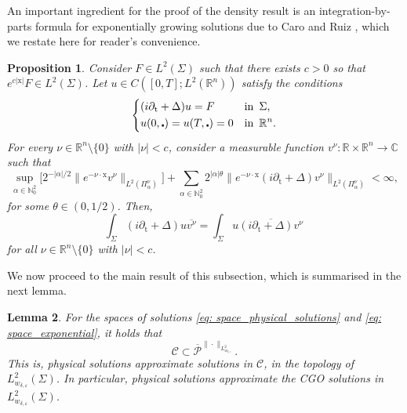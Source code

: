 \documentclass[10pt,a4paper]{amsart}
\newtheorem{proposition}{Proposition}[section]
\newtheorem{lemma}[proposition]{Lemma}
\theoremstyle{remark}
\theoremstyle{definition}
\newcommand{\R}{\mathbb{R}}
\newcommand{\C}{\mathbb{C}}
\newcommand{\N}{\mathbb{N}}
\newcommand{\tm}{\mathrm{t}}
\newcommand{\x}{\mathrm{x}}
\def\ve{\varepsilon}
\def\cal{\mathcal}
\def\ovl{\overline}
\begin{document}
An important ingredient for the proof of the density result is an integration-by-parts formula for exponentially growing solutions due to Caro and Ruiz \cite{zbMATH07801151}, which we restate here for reader's convenience. 
%
\begin{proposition}\cite[Proposition 4.9]{zbMATH07801151}\label{prop:CGO-PhS_int-by-parts}\sl 
Consider $F \in L^2(\Sigma)$ such that 
there exists $c > 0$ so that $e^{c|\x|} F \in L^2(\Sigma)$.
Let $u \in C([0,T]; L^2(\R^n))$ satisfy the conditions
%
\[
\left\{
%
		\begin{aligned}
		& (i\partial_\tm + \Delta) u = F & & \textnormal{in} \enspace \Sigma, \\
		& u(0, \centerdot) = u(T, \centerdot) = 0 &  & \textnormal{in} \enspace \R^n.
		\end{aligned}
%
	\right.
\]
%
For every $\nu \in \R^n \setminus \{ 0 \}$ with $|\nu| < c$,
consider a measurable function 
$v^\nu : \R \times \R^n \rightarrow \C$ such that
%
\[ \sup_{\alpha \in \N_0^2} \big[ 2^{-|\alpha|/2} \| e^{- \nu \cdot \x} v^\nu \|_{L^2(\Pi_\alpha^\nu)} \big] + \sum_{\alpha \in \N_0^2} 2^{|\alpha| \theta} \| e^{- \nu \cdot \x} (i\partial_\tm + \Delta) v^\nu \|_{L^2(\Pi_\alpha^\nu)} < \infty, \]
for some $\theta \in (0, 1/2)$. Then,
%
\[\int_\Sigma (i\partial_\tm + \Delta) u \overline{v^\nu} = \int_\Sigma u \overline{(i\partial_\tm + \Delta)v^\nu} \, \]
for all $\nu \in \R^n \setminus \{ 0 \}$ with $|\nu| < c$.
%
\end{proposition}
%
We now proceed to the main result of this subsection, which is summarised in the next lemma.

\begin{lemma}\label{lem: density_of_solutions_time}
For the spaces of solutions \eqref{eq: space_physical_solutions} and \eqref{eq: space_exponential}, it holds that 
%
\[
\cal{C} \subset \ovl{\cal{P}}^{\|\cdot\|_{L_{w_{\delta, \ve}}^2}}.
\]
%
This is, physical solutions approximate solutions in $\cal C$, in the topology of $L_{w_{\delta, \ve}}^2(\Sigma)$. In particular, physical solutions approximate the CGO solutions in $L_{w_{\delta, \ve}}^2(\Sigma)$.
\end{lemma}
%
\end{document}
